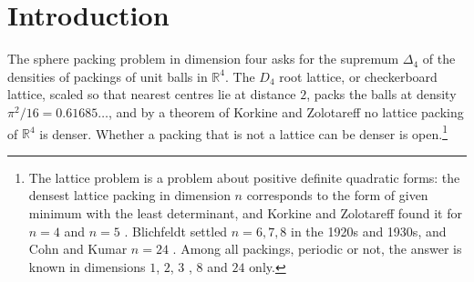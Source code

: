 \documentclass[11pt,reqno]{amsart}
\renewcommand{\_}{\origunderscore\allowbreak}
\numberwithin{equation}{section}
\theoremstyle{plain}
\theoremstyle{definition}
\theoremstyle{remark}
\begin{document}

\begin{abstract}
We prove that every Voronoi cell of a unit-ball packing in $\mathbb{R}^4$ has
at least the volume of the regular twenty-four-cell, with equality only for
$D_4$, unless $24$ to $28$ other centres lie within $\sqrt6$ of its centre,
not all at distance $2$. Hence the twenty-four-cell conjecture holds for every
contact configuration, $D_4$ is a strict local minimum of the cell volume, and
no periodic packing avoiding the exception is denser than $D_4$; the remaining
cells reduce to two explicit inequalities about at most twenty-eight centres.
A protected-hull construction proves the volume bound for a further
family of twenty-four-centre configurations with simultaneous radial
and directional perturbations.
For packings whose centres form at most two translates of a lattice the
conjecture holds in full: no such packing is denser than $D_4$, and
$\sqrt2\,D_4$ is the only one of that density. The cells alone bound the
density of every packing of unit balls in $\mathbb{R}^4$ by $0.63477$, below
the three-point bound.
\end{abstract}

\maketitle

\tableofcontents

\section{Introduction}\label{sec:intro}

The sphere packing problem in dimension four asks for the supremum
$\Delta_4$ of the densities of packings of unit balls in $\mathbb{R}^4$.
The $D_4$ root lattice, or checkerboard lattice, scaled so that nearest
centres lie at distance $2$, packs the balls at density
$\pi^2/16=0.61685\ldots$, and by a theorem of Korkine and Zolotareff
\cite{KZ1872} no lattice packing of $\mathbb{R}^4$ is denser. Whether a
packing that is not a lattice can be denser is open.\footnote{The lattice
  problem is a problem about positive definite quadratic forms: the densest
  lattice packing in dimension $n$ corresponds to the form of given minimum
  with the least determinant, and Korkine and Zolotareff found it for
  $n=4$ and $n=5$ \cite{KZ1872}. Blichfeldt settled $n=6,7,8$ in the
  1920s and 1930s, and Cohn and Kumar $n=24$ \cite{CK09}. Among all
  packings, periodic or not, the answer is known in dimensions $1$, $2$,
  $3$ \cite{Thu10,FT42,Hal05}, $8$ \cite{Via17} and $24$ \cite{CKM17}
  only.}
\end{document}
